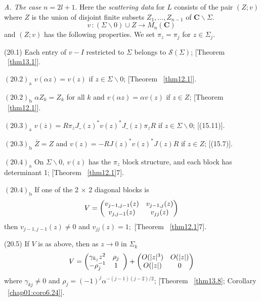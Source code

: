 \documentclass{surv-l}
\theoremstyle{plain}
\theoremstyle{definition}
\numberwithin{equation}{chapter}
\begin{document}
\emph{A. The case} $n=2l+1$. Here the \emph{scattering data} for $L$ consists of the pair $(Z; v)$ where $Z$ is the union of disjoint finite subsets $Z_{1},\ldots,Z_{n-1}$ of $ \textbf{C}\backslash\Sigma$.
\begin{equation*}
v\,:(\Sigma\backslash 0)\cup Z\rightarrow M_{n}(\mathbf{C})
\end{equation*}
and $(Z;v)$ has the following properties. We set $\pi_{z}=\pi_{j}$ for $z\in\Sigma_{j}$.

(20.1) Each entry of $v - I$ restricted to $\Sigma$ belongs to $\mathscr{S}(\Sigma)$; [Theorem ~\ref{thm13.1}].

$\mathrm{(20.2)}_{\mathrm{a}}$ $v(\alpha z)=v(z)$ if $z\in\Sigma\backslash 0$; [Theorem ~\ref{thm12.1}].

$\mathrm{(20.2)}_{\mathrm{b}}$ $\alpha Z_{k}=Z_{k}$ for all $k$ and $v(\alpha z)=\alpha v(z)$ if $z\in Z$; [Theorem ~\ref{thm12.1}].

$\mathrm{(20.3)}_{\mathrm{a}}$ $v(\overline{z})=R\pi_{z}J\_ (z)^{*}v(z)^{*}J\_ (z)\pi_{z}R$ if $z\in\Sigma \backslash 0$; [(15.11)].

$\mathrm{(20.3)}_{\mathrm{b}}$ $\overline{Z}=Z$ and $v(z)=-RJ(z)^{*}v(z)^{*}J(z)R$ if $z\in Z$; [(15.7)].

$\mathrm{(20.4)}_{\mathrm{a}}$ On $\Sigma\backslash 0,\ v(z)$ has the $\pi_{z}$ block structure, and each block has determinant 1; [Theorem ~\ref{thm12.1}7].

$\mathrm{(20.4)_{b}}$ If one of the 2 $\times$ 2 diagonal blocks is
\begin{equation*}
V=\left(\begin{array}{@{}cc@{}}
v_{j-1,j-1}(z) & v_{j-1,j}(z)\\
v_{j,j-1}(z) & v_{jj}(z)
\end{array}\right)
\end{equation*}
then $v_{j-1,j-1}(z)\neq 0$ and $v_{j j}(z)=1;$ [Theorem ~\ref{thm12.1}7].

(20.5) If $V$ is as above, then as $z\rightarrow 0$ in $\Sigma_{k}$
\begin{equation*}
V=\left(\begin{array}{@{}ccc@{}}
\gamma_{k_{j}}z^{2} & \rho_{j}\\
-\rho_{j}^{-1} &  1
\end{array}\right)  + \left(\begin{array}{@{}cc@{}}
O(|z|^{3}) & O(|z|)\\
O(|z|) & 0
\end{array}\right)
\end{equation*}
where $\gamma_{kj}\neq 0$ and $\rho_{j}=(-1)^{j}\alpha^{-(j-1)(j-2)/2}$; [Theorem ~\ref{thm13.8}; Corollary ~\ref{chap01:coro6.24}].
\end{document}
